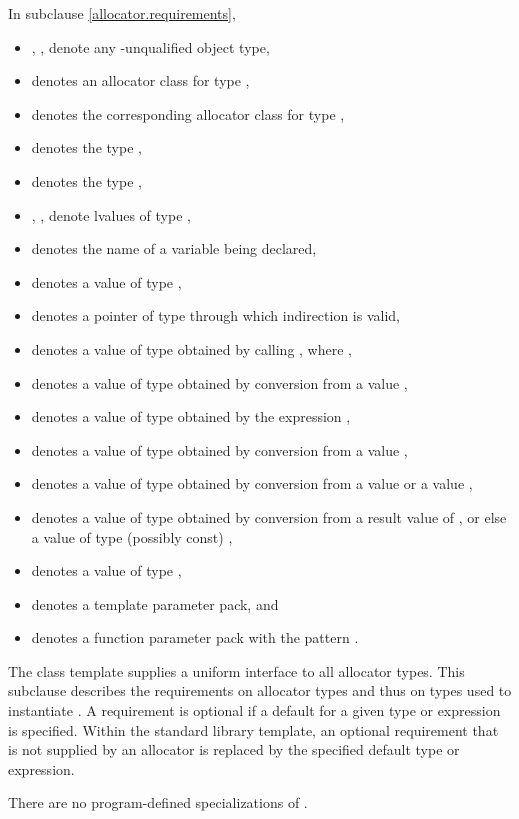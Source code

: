 \pnum
In subclause \ref{allocator.requirements},
\begin{itemize}
\item
{}, ,  denote
any \cv-unqualified object type,
\item
{} denotes an allocator class for type ,
\item
{} denotes the corresponding allocator class for type ,
\item
{} denotes the type ,
\item
{} denotes the type ,
\item
{}, ,  denote lvalues of type ,
\item
{} denotes the name of a variable being declared,
\item
{} denotes a value of type ,
\item
{} denotes a pointer of type 
through which indirection is valid,
\item
{} denotes a value of type 
obtained by calling , where ,
\item
{} denotes a value of type 
obtained by conversion from a value ,
\item
{} denotes a value of type 
obtained by the expression ,
\item
{} denotes a value of type 
obtained by conversion from a value ,
\item
{} denotes a value of type 
obtained by conversion from a value  or a value ,
\item
{} denotes a value of type 
obtained by conversion from a result value of , or else
a value of type (possibly const) ,
\item
{} denotes a value of type ,
\item
{} denotes a template parameter pack, and
\item
{} denotes
a function parameter pack with the pattern .
\end{itemize}

\pnum
The class template  supplies
a uniform interface to all allocator types.
This subclause
describes the requirements on allocator types
and thus on types used to instantiate .
A requirement is optional if a default for a
given type or expression is specified.
Within the standard library 
template, an optional requirement that is not supplied by an allocator is
replaced by the specified default type or expression.
\begin{note}
There are no program-defined specializations of .
\end{note}

